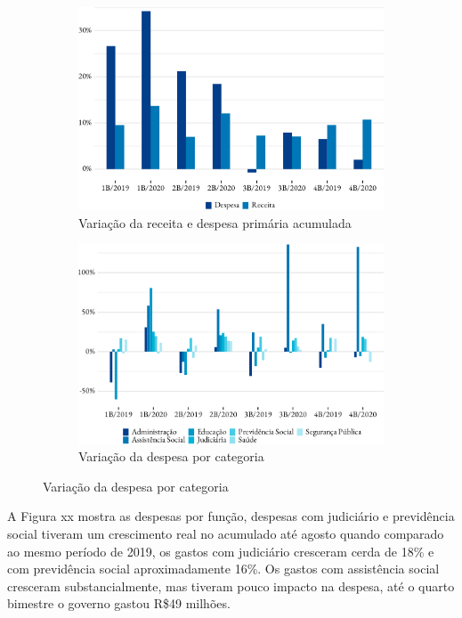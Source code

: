 \begin{figure}[!h]
\begin{subfigure}{\linewidth}
\caption{\label{fig:var_rec_desp}Variação da receita e despesa primária
acumulada}
\includegraphics{fig/var_receita_despesa_primaria-1.pdf}
\end{subfigure}
\begin{subfigure}{\linewidth}
\caption{\label{fig:var_desp_func}Variação da despesa por categoria}
\includegraphics{fig/var_despesa_categoria-1.pdf}
\end{subfigure}
\end{figure}

A Figura xx mostra as despesas por função, despesas com judiciário e
previdência social tiveram um crescimento real no acumulado até agosto
quando comparado ao mesmo período de 2019, os gastos com judiciário
cresceram cerda de 18\% e com previdência social aproximadamente 16\%.
Os gastos com assistência social cresceram substancialmente, mas tiveram
pouco impacto na despesa, até o quarto bimestre o governo gastou R\$49
milhões.

